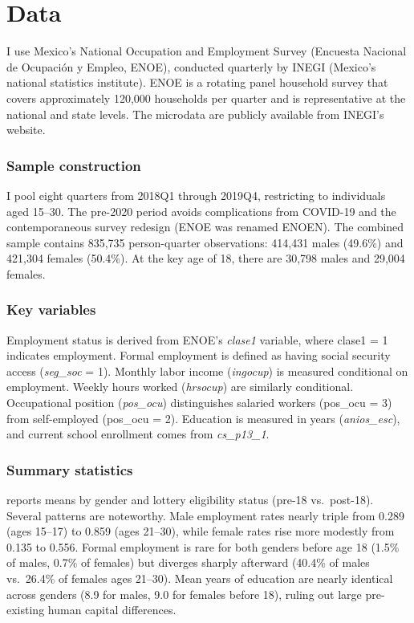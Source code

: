 \documentclass[12pt]{article}
\begin{document}
\section{Data}

I use Mexico's National Occupation and Employment Survey (Encuesta Nacional de Ocupaci\'{o}n y Empleo, ENOE), conducted quarterly by INEGI (Mexico's national statistics institute). ENOE is a rotating panel household survey that covers approximately 120,000 households per quarter and is representative at the national and state levels. The microdata are publicly available from INEGI's website.

\subsubsection*{Sample construction} I pool eight quarters from 2018Q1 through 2019Q4, restricting to individuals aged 15--30. The pre-2020 period avoids complications from COVID-19 and the contemporaneous survey redesign (ENOE was renamed ENOEN). The combined sample contains 835,735 person-quarter observations: 414,431 males (49.6\%) and 421,304 females (50.4\%). At the key age of 18, there are 30,798 males and 29,004 females.

\subsubsection*{Key variables} Employment status is derived from ENOE's \textit{clase1} variable, where clase1 = 1 indicates employment. Formal employment is defined as having social security access (\textit{seg\_soc} = 1). Monthly labor income (\textit{ingocup}) is measured conditional on employment. Weekly hours worked (\textit{hrsocup}) are similarly conditional. Occupational position (\textit{pos\_ocu}) distinguishes salaried workers (pos\_ocu = 3) from self-employed (pos\_ocu = 2). Education is measured in years (\textit{anios\_esc}), and current school enrollment comes from \textit{cs\_p13\_1}.

\subsubsection*{Summary statistics}  reports means by gender and lottery eligibility status (pre-18 vs.\ post-18). Several patterns are noteworthy. Male employment rates nearly triple from 0.289 (ages 15--17) to 0.859 (ages 21--30), while female rates rise more modestly from 0.135 to 0.556. Formal employment is rare for both genders before age 18 (1.5\% of males, 0.7\% of females) but diverges sharply afterward (40.4\% of males vs.\ 26.4\% of females ages 21--30). Mean years of education are nearly identical across genders (8.9 for males, 9.0 for females before 18), ruling out large pre-existing human capital differences.
\end{document}

